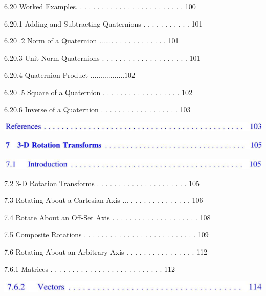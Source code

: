 \documentclass[10pt]{article}
\begin{document}
6.20 Worked Examples. . . . . . . . . . . . . . . . . . . . . . . . . 100

6.20.1 Adding and Subtracting Quaternions . . . . . . . . . . . 101

6.20 .2 Norm of a Quaternion ....... . . . . . . . . . . . . 101

6.20.3 Unit-Norm Quaternions . . . . . . . . . . . . . . . . . . . . 101

6.20.4 Quaternion Product $\ldots . \ldots \ldots . \ldots \ldots 102$

6.20 .5 Square of a Quaternion . . . . . . . . . . . . . . . . . . 102

6.20.6 Inverse of a Quaternion . . . . . . . . . . . . . . . . . . 103

\begin{center}
\includegraphics[max width=\textwidth]{2023_04_20_41f1ceac5a31dc7d1b59g-012(3)}
\end{center}

\begin{center}
\includegraphics[max width=\textwidth]{2023_04_20_41f1ceac5a31dc7d1b59g-012(2)}
\end{center}

\begin{center}
\includegraphics[max width=\textwidth]{2023_04_20_41f1ceac5a31dc7d1b59g-012}
\end{center}

7.2 3-D Rotation Transforms . . . . . . . . . . . . . . . . . . . . . 105

7.3 Rotating About a Cartesian Axis ... . . . . . . . . . . . . . . 106

7.4 Rotate About an Off-Set Axis . . . . . . . . . . . . . . . . . . . . 108

7.5 Composite Rotations . . . . . . . . . . . . . . . . . . . . . . . . . . 109

7.6 Rotating About an Arbitrary Axis . . . . . . . . . . . . . . . . 112

7.6.1 Matrices . . . . . . . . . . . . . . . . . . . . . . . . . . 112

\begin{center}
\includegraphics[max width=\textwidth]{2023_04_20_41f1ceac5a31dc7d1b59g-012(4)}
\end{center}
\end{document}
